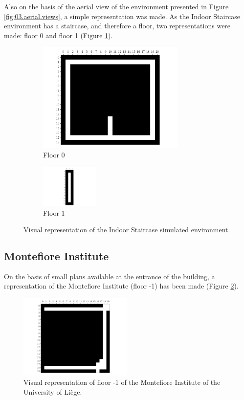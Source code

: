 Also on the basis of the aerial view of the environment presented in Figure \ref{fig:03.aerial.views}, a simple representation was made. As the Indoor Staircase environment has a staircase, and therefore a floor, two representations were made: floor 0 and floor 1 (Figure \ref{fig:05.indoor.staircase.representation}).

\begin{figure}[H]
    \centering
    \begin{subfigure}[b]{0.58\textwidth}
        \centering
        \includegraphics[width=0.8\textwidth]{resources/pdf/05/indoor-staircase/0.pdf}
        \caption{Floor 0}
    \end{subfigure}
    \hfill
    \begin{subfigure}[b]{0.38\textwidth}
        \centering
        \includegraphics[width=0.313\textwidth]{resources/pdf/05/indoor-staircase/1.pdf}
        \caption{Floor 1}
    \end{subfigure}
    \caption{Visual representation of the Indoor Staircase simulated environment.}
    \label{fig:05.indoor.staircase.representation}
\end{figure}

\subsection{Montefiore Institute}\label{sec:05.montefiore.institute}

On the basis of small plans available at the entrance of the building, a representation of the Montefiore Institute (floor -1) has been made (Figure \ref{fig:05.b28.representation}).

\begin{figure}[H]
    \centering
    \includegraphics[width=0.5\textwidth]{resources/pdf/05/b28/basement.pdf}
    \caption{Visual representation of floor -1 of the Montefiore Institute of the University of Liège.}
    \label{fig:05.b28.representation}
\end{figure}
